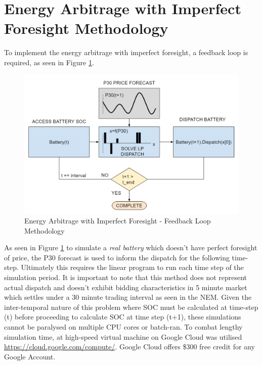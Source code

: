 \section{ Energy Arbitrage with Imperfect Foresight Methodology }
To implement the energy arbitrage with imperfect foresight, a feedback loop is required, as seen in Figure \ref{fig:feedback_loop}.
\begin{figure}[H]
    \centering
    \includegraphics{Pictures/Chapter4/feedback_loop.png}
    \caption{Energy Arbitrage with Imperfect Foresight - Feedback Loop Methodology}
    \label{fig:feedback_loop}
\end{figure}
As seen in Figure \ref{fig:feedback_loop} to simulate a \textit{real battery} which doesn't have perfect foresight of price, the P30 forecast is used to inform the dispatch for the following time-step. Ultimately this requires the linear program to run each time step of the simulation period. It is important to note that this method does not represent actual dispatch and doesn't exhibit bidding characteristics in  5 minute market which settles under a 30 minute trading interval as seen in the NEM. 
Given the inter-temporal nature of this problem where SOC must be calculated at time-step (t) before proceeding to calculate SOC at time step (t+1), these simulations cannot be paralysed on multiple CPU cores or batch-ran.  To combat lengthy simulation time, at high-speed virtual machine on Google Cloud was utilised \url{https://cloud.google.com/compute/}. Google Cloud offers \$300 free credit for any Google Account. 
